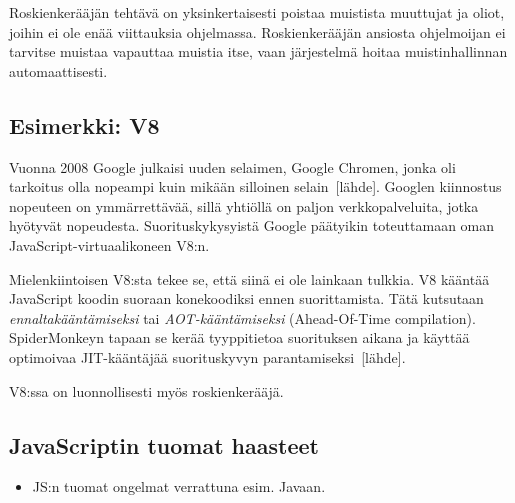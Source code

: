 Roskienkerääjän tehtävä on yksinkertaisesti poistaa muistista muuttujat ja oliot, joihin ei ole enää viittauksia ohjelmassa. Roskienkerääjän ansiosta ohjelmoijan ei tarvitse muistaa vapauttaa muistia itse, vaan järjestelmä hoitaa muistinhallinnan automaattisesti.

\subsection{Esimerkki: V8}

Vuonna 2008 Google julkaisi uuden selaimen, Google Chromen, jonka oli tarkoitus olla nopeampi kuin mikään silloinen selain~[lähde]. Googlen kiinnostus nopeuteen on ymmärrettävää, sillä yhtiöllä on paljon verkkopalveluita, jotka hyötyvät nopeudesta. Suorituskykysyistä Google päätyikin toteuttamaan oman JavaScript-virtuaalikoneen V8:n.

Mielenkiintoisen V8:sta tekee se, että siinä ei ole lainkaan tulkkia. V8 kääntää JavaScript koodin suoraan konekoodiksi ennen suorittamista. Tätä kutsutaan \textit{ennaltakääntämiseksi} tai \textit{AOT-kääntämiseksi} (Ahead-Of-Time compilation). SpiderMonkeyn tapaan se kerää tyyppitietoa suorituksen aikana ja käyttää optimoivaa JIT-kääntäjää suorituskyvyn parantamiseksi~[lähde].

V8:ssa on luonnollisesti myös roskienkerääjä.

\subsection{JavaScriptin tuomat haasteet}

\begin{itemize}
\item JS:n tuomat ongelmat verrattuna esim. Javaan.
\end{itemize}